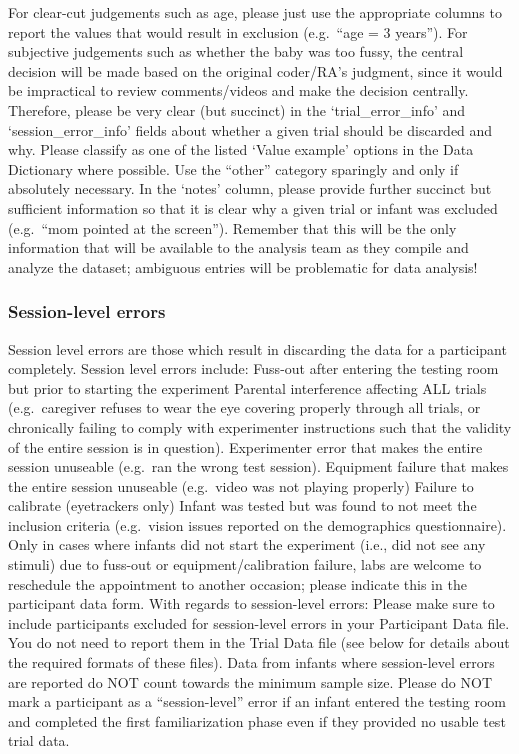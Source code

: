 \documentclass[
  letterpaper,
  DIV=11,
  numbers=noendperiod,
  oneside]{scrreprt}
\begin{document}
For clear-cut judgements such as age, please just use the appropriate
columns to report the values that would result in exclusion (e.g.~``age
= 3 years''). For subjective judgements such as whether the baby was too
fussy, the central decision will be made based on the original
coder/RA's judgment, since it would be impractical to review
comments/videos and make the decision centrally. Therefore, please be
very clear (but succinct) in the `trial\_error\_info' and
`session\_error\_info' fields about whether a given trial should be
discarded and why. Please classify as one of the listed `Value example'
options in the Data Dictionary where possible. Use the ``other''
category sparingly and only if absolutely necessary. In the `notes'
column, please provide further succinct but sufficient information so
that it is clear why a given trial or infant was excluded (e.g.~``mom
pointed at the screen''). Remember that this will be the only
information that will be available to the analysis team as they compile
and analyze the dataset; ambiguous entries will be problematic for data
analysis!

\subsubsection{Session-level errors}\label{session-level-errors}

Session level errors are those which result in discarding the data for a
participant completely. Session level errors include: Fuss-out after
entering the testing room but prior to starting the experiment Parental
interference affecting ALL trials (e.g.~caregiver refuses to wear the
eye covering properly through all trials, or chronically failing to
comply with experimenter instructions such that the validity of the
entire session is in question). Experimenter error that makes the entire
session unuseable (e.g.~ran the wrong test session). Equipment failure
that makes the entire session unuseable (e.g.~video was not playing
properly) Failure to calibrate (eyetrackers only) Infant was tested but
was found to not meet the inclusion criteria (e.g.~vision issues
reported on the demographics questionnaire). Only in cases where infants
did not start the experiment (i.e., did not see any stimuli) due to
fuss-out or equipment/calibration failure, labs are welcome to
reschedule the appointment to another occasion; please indicate this in
the participant data form. With regards to session-level errors: Please
make sure to include participants excluded for session-level errors in
your Participant Data file. You do not need to report them in the Trial
Data file (see below for details about the required formats of these
files). Data from infants where session-level errors are reported do NOT
count towards the minimum sample size. Please do NOT mark a participant
as a ``session-level'' error if an infant entered the testing room and
completed the first familiarization phase even if they provided no
usable test trial data.
\end{document}
